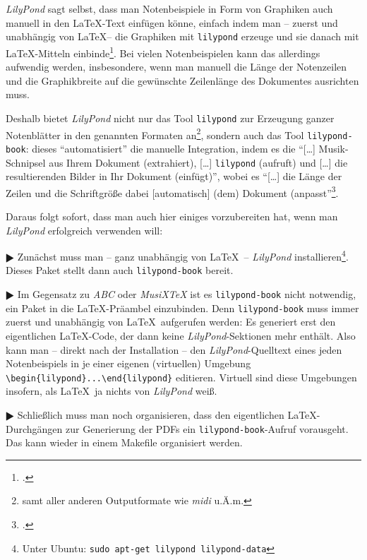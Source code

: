 \emph{LilyPond} sagt selbst, dass man Notenbeispiele in Form von Graphiken auch
manuell in den \LaTeX-Text einfügen könne, einfach indem man -- zuerst und
unabhängig von \LaTeX -- die Graphiken mit \texttt{lilypond} erzeuge und sie
danach mit \LaTeX-Mitteln einbinde\footcite[vgl.][20]{LilyPond2018e}. Bei vielen
Notenbeispielen kann das allerdings aufwendig werden, insbesondere, wenn man
manuell die Länge der Notenzeilen und die Graphikbreite auf die gewünschte
Zeilenlänge des Dokumentes ausrichten muss.

Deshalb bietet \emph{LilyPond} nicht nur das Tool \texttt{lilypond} zur
Erzeugung ganzer Notenblätter in den genannten Formaten an\footnote{samt aller
anderen Outputformate wie \emph{midi} u.Ä.m.}, sondern auch das Tool
\texttt{lilypond-book}: dieses \enquote{automatisiert} die manuelle Integration,
indem es die \enquote{[\ldots] Musik-Schnipsel aus Ihrem Dokument (extrahiert),
[\ldots] \texttt{lilypond} (aufruft) und [\ldots] die resultierenden Bilder in
Ihr Dokument (einfügt)}, wobei es \enquote{[\ldots] die Länge der Zeilen und die
Schriftgröße dabei [automatisch] (dem) Dokument
(anpasst}\footcite[vgl.][20]{LilyPond2018e}.

Daraus folgt sofort, dass man auch hier einiges vorzubereiten hat, wenn man
\emph{LilyPond} erfolgreich verwenden will:

$\RHD$ Zunächst muss man -- ganz unabhängig von \LaTeX\ -- \emph{LilyPond}
installieren\footnote{Unter Ubuntu: \texttt{sudo apt-get lilypond
lilypond-data}}. Dieses Paket stellt dann auch \texttt{lilypond-book} bereit.
  
$\RHD$ Im Gegensatz zu \emph{ABC} oder \emph{MusiX\TeX} ist es
\texttt{lilypond-book} nicht notwendig, ein Paket in die \LaTeX-Präambel
einzubinden. Denn \texttt{lilypond-book} muss immer zuerst und unabhängig von
\LaTeX\ aufgerufen werden: Es generiert erst den eigentlichen \LaTeX-Code, der
dann keine \emph{LilyPond}-Sektionen mehr enthält. Also kann man -- direkt nach
der Installation -- den \emph{LilyPond}-Quelltext eines jeden Notenbeispiels in
je einer eigenen (virtuellen) Umgebung \verb|\begin{lilypond}...\end{lilypond}|
editieren. Virtuell sind diese Umgebungen insofern, als \LaTeX\ ja nichts von
\emph{LilyPond} weiß.

$\RHD$ Schließlich muss man noch organisieren, dass den eigentlichen
\LaTeX-Durchgängen zur Generierung der PDFs ein \texttt{lilypond-book}-Aufruf
vorausgeht. Das kann wieder in einem Makefile organisiert werden.

